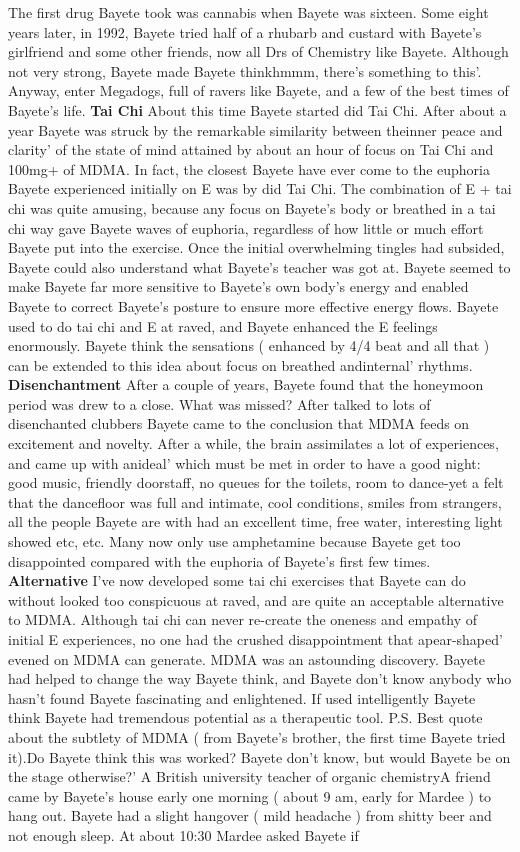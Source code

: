 \documentclass[12pt]{book}
\begin{document}
The first drug Bayete took was cannabis when Bayete was sixteen. Some eight years later, in 1992, Bayete tried half of a rhubarb and custard with Bayete's girlfriend and some other friends, now all Drs of Chemistry like Bayete. Although not very strong, Bayete made Bayete thinkhmmm, there's something to this'. Anyway, enter Megadogs, full of ravers like Bayete, and a few of the best times of Bayete's life. \textbf{Tai Chi} About this time Bayete started did Tai Chi. After about a year Bayete was struck by the remarkable similarity between theinner peace and clarity' of the state of mind attained by about an hour of focus on Tai Chi and 100mg+ of MDMA. In fact, the closest Bayete have ever come to the euphoria Bayete experienced initially on E was by did Tai Chi. The combination of E + tai chi was quite amusing, because any focus on Bayete's body or breathed in a tai chi way gave Bayete waves of euphoria, regardless of how little or much effort Bayete put into the exercise. Once the initial overwhelming tingles had subsided, Bayete could also understand what Bayete's teacher was got at. Bayete seemed to make Bayete far more sensitive to Bayete's own body's energy and enabled Bayete to correct Bayete's posture to ensure more effective energy flows. Bayete used to do tai chi and E at raved, and Bayete enhanced the E feelings enormously. Bayete think the sensations ( enhanced by 4/4 beat and all that ) can be extended to this idea about focus on breathed andinternal' rhythms. \textbf{Disenchantment} After a couple of years, Bayete found that the honeymoon period was drew to a close. What was missed? After talked to lots of disenchanted clubbers Bayete came to the conclusion that MDMA feeds on excitement and novelty. After a while, the brain assimilates a lot of experiences, and came up with anideal' which must be met in order to have a good night: good music, friendly doorstaff, no queues for the toilets, room to dance-yet a felt that the dancefloor was full and intimate, cool conditions, smiles from strangers, all the people Bayete are with had an excellent time, free water, interesting light showed etc, etc. Many now only use amphetamine because Bayete get too disappointed compared with the euphoria of Bayete's first few times. \textbf{Alternative} I've now developed some tai chi exercises that Bayete can do without looked too conspicuous at raved, and are quite an acceptable alternative to MDMA. Although tai chi can never re-create the oneness and empathy of initial E experiences, no one had the crushed disappointment that apear-shaped' evened on MDMA can generate. MDMA was an astounding discovery. Bayete had helped to change the way Bayete think, and Bayete don't know anybody who hasn't found Bayete fascinating and enlightened. If used intelligently Bayete think Bayete had tremendous potential as a therapeutic tool. P.S. Best quote about the subtlety of MDMA ( from Bayete's brother, the first time Bayete tried it).Do Bayete think this was worked? Bayete don't know, but would Bayete be on the stage otherwise?' A British university teacher of organic chemistryA friend came by Bayete's house early one morning ( about 9 am, early for Mardee ) to hang out. Bayete had a slight hangover ( mild headache ) from shitty beer and not enough sleep. At about 10:30 Mardee asked Bayete if 
\end{document}
